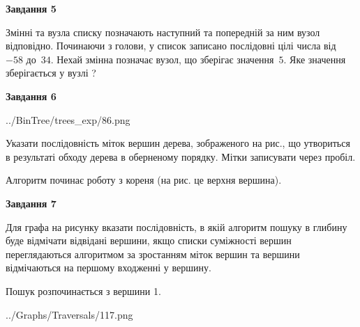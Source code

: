\documentclass[12pt, ukrainian]{article}
\begin{document}
{\begin {large}
{\begin {center}\textbf{Завдання 5}\end {center}}\par
Змінні  та  вузла списку позначають наступний та попередній за ним вузол відповідно. Починаючи з голови, у список записано послідовні цілі числа від~$-58$ до~$34$. Нехай змінна  позначає вузол, що зберігає значення~$5$.
Яке значення зберігається у вузлі  ?\par
\newpage

{\begin {center}\textbf{Завдання 6}\end {center}}\par

\begin{center}
	{../BinTree/trees_exp/86.png}
\end{center}
Указати послідовність міток вершин дерева, зображеного на рис., що утвориться в результаті обходу дерева в оберненому порядку. Мітки записувати через пробіл.\par Алгоритм починає роботу з кореня (на рис. це верхня вершина).\par
\newpage

{\begin {center}\textbf{Завдання 7}\end {center}}\par
Для графа на рисунку вказати послідовність, в якій алгоритм пошуку в глибину буде відмічати відвідані вершини, якщо списки суміжності вершин переглядаються алгоритмом за зростанням міток вершин та вершини відмічаються на першому вход\-женні у вершину.\par
Пошук розпочинається з вершини 1.\par

\begin{center}
	{../Graphs/Traversals/117.png}
\end{center}\par
\newpage


\end{large}}
\end{document}

